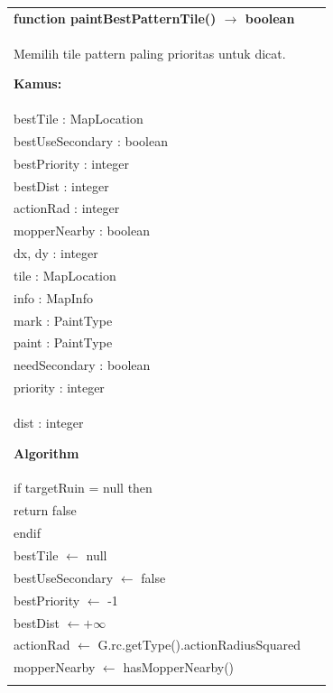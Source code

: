 \documentclass{article}
\newenvironment{pseudobox}
{
\centering
\begin{longtable}{|p{0.94\linewidth}|}
\hline
}
{
\\ \hline
\end{longtable}
\vspace{0.05cm}
}
\begin{document}
\begin{pseudobox}
\textbf{function paintBestPatternTile() $\rightarrow$ boolean} \\
{ Memilih tile pattern paling prioritas untuk dicat. }

\textbf{Kamus:} \\
\hspace*{1em} bestTile : MapLocation \\
\hspace*{1em} bestUseSecondary : boolean \\
\hspace*{1em} bestPriority : integer \\
\hspace*{1em} bestDist : integer \\
\hspace*{1em} actionRad : integer \\
\hspace*{1em} mopperNearby : boolean \\
\hspace*{1em} dx, dy : integer \\
\hspace*{1em} tile : MapLocation \\
\hspace*{1em} info : MapInfo \\
\hspace*{1em} mark : PaintType \\
\hspace*{1em} paint : PaintType \\
\hspace*{1em} needSecondary : boolean \\
\hspace*{1em} priority : integer \\
\hspace*{1em} dist : integer

\textbf{Algorithm} \\
\hspace*{1em} if targetRuin = null then \\
\hspace*{2em} return false \\
\hspace*{1em} endif \\

\hspace*{1em} bestTile $\leftarrow$ null \\
\hspace*{1em} bestUseSecondary $\leftarrow$ false \\
\hspace*{1em} bestPriority $\leftarrow$ -1 \\
\hspace*{1em} bestDist $\leftarrow +\infty$ \\
\hspace*{1em} actionRad $\leftarrow$ G.rc.getType().actionRadiusSquared \\
\hspace*{1em} mopperNearby $\leftarrow$ hasMopperNearby() \\


\end{pseudobox}
\end{document}
